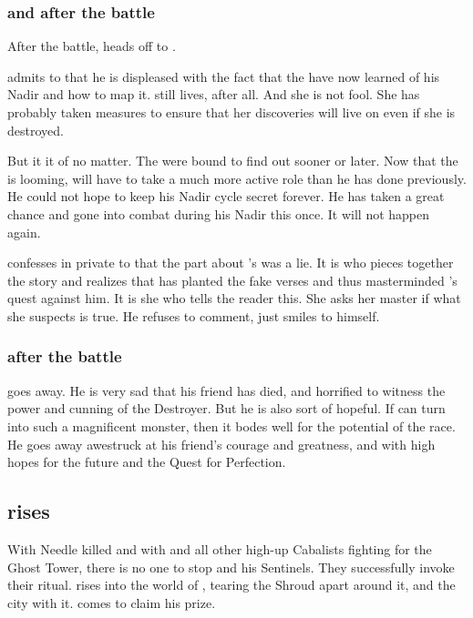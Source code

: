 \subsubsection{\Ishnaruchaefir and \Criseis after the battle}
After the battle, \Ishnaruchaefir heads off to \Malcur.

\Ishnaruchaefir admits to \Criseis that he is displeased with the fact that the \resphain have now learned of his Nadir and how to map it.
\Urizeth still lives, after all.
And she is not fool.
She has probably taken measures to ensure that her discoveries will live on even if she is destroyed. 

But it it of no matter. 
The \resphain were bound to find out sooner or later. 
Now that the \thirdbanewar is looming, \Ishnaruchaefir will have to take a much more active role than he has done previously. 
He could not hope to keep his Nadir cycle secret forever. 
He has taken a great chance and gone into combat during his Nadir this once.
It will not happen again. 

\Ishnaruchaefir confesses in private to \Criseis that the part about \Ishnaruchaefir's  was a lie. 
It is \Criseis who pieces together the story and realizes that \Ishnaruchaefir has planted the fake \WanderersInDarknessEmph verses and thus masterminded \Teshrial's quest against him. 
It is she who tells the reader this.
She asks her master if what she suspects is true. 
He refuses to comment, just smiles to himself.





\subsubsection{\Menessiaraid after the battle}
\Menessiaraid goes away. 
He is very sad that his friend has died, and horrified to witness the power and cunning of the Destroyer. 
But he is also sort of hopeful. 
If \Teshrial can turn into such a magnificent monster, then it bodes well for the potential of the \resphan race. 
He goes away awestruck at his friend's courage and greatness, and with high hopes for the future and the Quest for Perfection.









\subsection{\Nithdornazsh rises}
With Needle killed and with \Achsah{} and all other high-up Cabalists fighting for the Ghost Tower, there is no one to stop \Psyrex{} and his \Malcurian Sentinels.
They successfully invoke their ritual. \Nithdornazsh{} rises into the world of \Miith{}, tearing the Shroud apart around it, and the city with it. 
\Secherdamon{} comes to claim his prize. 

